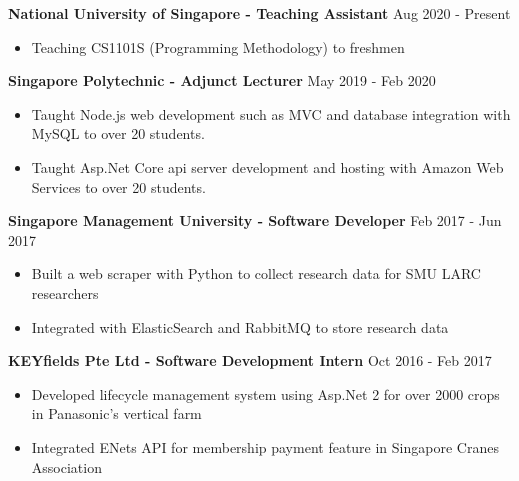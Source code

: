 \documentclass[11pt]{article} %
\begin{document}
\medskip

\textbf{National University of Singapore - Teaching Assistant} \hfill Aug 2020 - Present

\smallskip
\begin{itemize}

    \item Teaching CS1101S (Programming Methodology) to freshmen

\end{itemize}

\medskip

\textbf{Singapore Polytechnic - Adjunct Lecturer} \hfill May 2019 - Feb 2020

\smallskip
\begin{itemize}

    \item Taught Node.js web development such as MVC and database integration with MySQL to over 20 students.
    \item Taught Asp.Net Core api server development and hosting with Amazon Web Services to over 20 students.

\end{itemize}

\medskip

\textbf{Singapore Management University - Software Developer} \hfill Feb 2017 - Jun 2017

\smallskip
\begin{itemize}

    \item Built a web scraper with Python to collect research data for SMU LARC researchers
    \item Integrated with ElasticSearch and RabbitMQ to store research data

\end{itemize}

\medskip

\textbf{KEYfields Pte Ltd - Software Development Intern} \hfill Oct 2016 - Feb 2017

\smallskip
\begin{itemize}

    \item Developed lifecycle management system using Asp.Net 2 for over 2000 crops in Panasonic's vertical farm
    \item Integrated ENets API for membership payment feature in Singapore Cranes Association

\end{itemize}
\end{document}
